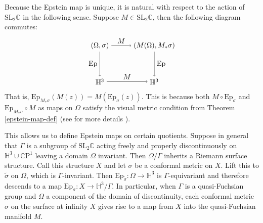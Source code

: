 \documentclass{amsart}
\newcommand{\C}{\mathbb{C}}
\newcommand{\CP}{\mathbb{C}\mathrm{P}}
\renewcommand{\H}{\mathbb{H}}
\begin{document}
Because the Epstein map is unique, it is natural with respect to the action of $\mathrm{SL}_2\C$ in the following sense. 
Suppose $M \in \mathrm{SL}_2\C$, then the following diagram commutes:
\[
\begin{tikzpicture}[scale=0.9]
\node (1) at (0,2) {$(\Omega,\sigma)$};
\node (2) at (3,2) {$(M(\Omega),M_*\sigma)$};
\node (3) at (0,0) {$\H^3$};
\node (4) at (3,0) {$\H^3$};


\draw[->] (1) to node [above] {$M$} (2);
\draw[->] (1) to node [left] {$\mathrm{Ep}$} (3);
\draw[->] (3) to node [above] {$M$} (4);
\draw[->] (2) to node [right] {$\mathrm{Ep}$} (4);

\end{tikzpicture}
\]
That is, $\mathrm{Ep}_{M_*\sigma}(M(z)) = M( \mathrm{Ep}_{\sigma}(z))$. 
This is because both $M \circ \mathrm{Ep}_\sigma$ and $\mathrm{Ep}_{M_*\sigma} \circ M$ as maps on $\Omega$ satisfy the visual metric condition from Theorem \ref{epstein-map-def} (see \cite{anderson1998} for more details ).

This allows us to define Epstein maps on certain quotients. 
Suppose in general that $\Gamma$ is a subgroup of $\mathrm{SL}_2\C$ acting freely and properly discontinuously on $\H^3 \cup \CP^1$ leaving a domain $\Omega$ invariant. 
Then $\Omega/\Gamma$ inherits a Riemann surface structure. 
Call this structure $X$ and let $\sigma$ be a conformal metric  on $X$.
Lift this to $\tilde{\sigma}$ on $\Omega$, which is $\Gamma$-invariant. 
Then $\mathrm{Ep}_{\tilde{\sigma}}: \Omega \to \H^3$ is $\Gamma$-equivariant and therefore descends to a map $\mathrm{Ep}_\sigma : X \to \H^3/ \Gamma$. 
In particular, when $\Gamma$ is a quasi-Fuchsian group and $\Omega$ a component of the domain of discontinuity, each conformal metric $\sigma$ on the surface at infinity $X$ gives rise to a map from $X$ into the quasi-Fuchsian manifold $M$.
\end{document}

